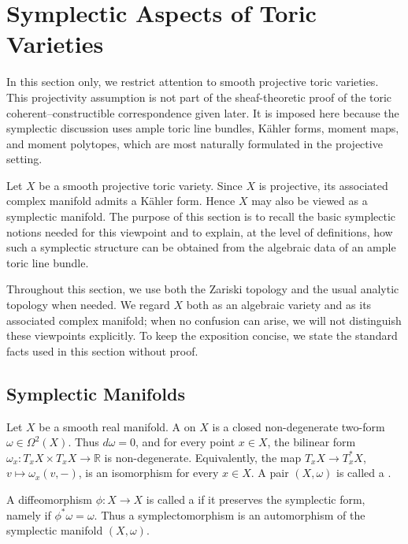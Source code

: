 {\begingroup



\section{Symplectic Aspects of Toric Varieties}

In this section only, we restrict attention to smooth projective toric varieties.
This projectivity assumption is not part of the sheaf-theoretic proof of the
toric coherent--constructible correspondence given later. It is imposed here
because the symplectic discussion uses ample toric line bundles, Kähler forms,
moment maps, and moment polytopes, which are most naturally formulated in the
projective setting.

Let \(X\) be a smooth projective toric variety. Since \(X\) is projective, its
associated complex manifold admits a Kähler form. Hence \(X\) may also be viewed
as a symplectic manifold. The purpose of this section is to recall the basic
symplectic notions needed for this viewpoint and to explain, at the level of
definitions, how such a symplectic structure can be obtained from the algebraic
data of an ample toric line bundle.

Throughout this section, we use both the Zariski topology and the usual analytic
topology when needed. We regard \(X\) both as an algebraic variety and as its
associated complex manifold; when no confusion can arise, we will not distinguish
these viewpoints explicitly. To keep the exposition concise, we state the
standard facts used in this section without proof.






\subsection{Symplectic Manifolds}

Let \(X\) be a smooth real manifold.  A  on
\(X\) is a closed non-degenerate two-form \(\omega\in\Omega^2(X)\).
Thus \(d\omega=0\), and for every point \(x\in X\), the bilinear form
\(\omega_x:T_xX\times T_xX\to\mathbb R\) is non-degenerate.
Equivalently, the map \(T_xX\to T_x^*X\), \(v\mapsto \omega_x(v,-)\),
is an isomorphism for every \(x\in X\).  A pair \((X,\omega)\) is called
a .

A diffeomorphism \(\phi:X\to X\) is called a 
if it preserves the symplectic form, namely if \(\phi^*\omega=\omega\).
Thus a symplectomorphism is an automorphism of the symplectic manifold
\((X,\omega)\).

}
